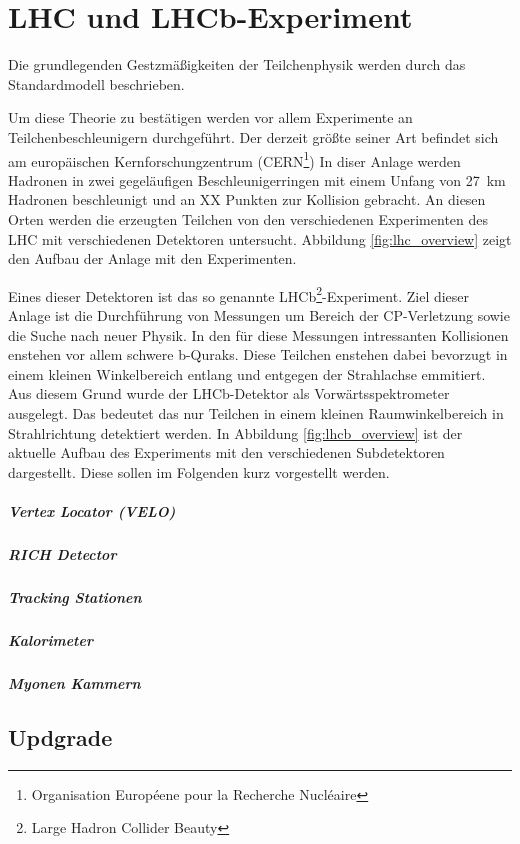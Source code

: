 \chapter{LHC und LHCb-Experiment}
Die grundlegenden Gestzmäßigkeiten der Teilchenphysik werden durch das Standardmodell beschrieben. 



Um diese Theorie zu bestätigen werden vor allem Experimente an Teilchenbeschleunigern durchgeführt.
Der derzeit größte seiner Art befindet sich am europäischen Kernforschungzentrum (CERN\footnote{Organisation Européene pour la Recherche Nucléaire})
In diser Anlage werden Hadronen in zwei gegeläufigen Beschleunigerringen mit einem Unfang von \SI{27}{\kilo\meter} Hadronen beschleunigt und an XX 
Punkten zur Kollision gebracht. An diesen Orten werden die erzeugten Teilchen von den verschiedenen Experimenten des LHC mit verschiedenen 
Detektoren untersucht. Abbildung \ref{fig:lhc_overview} zeigt den Aufbau der Anlage mit den Experimenten. 

\noindent
Eines dieser Detektoren ist das so genannte LHCb\footnote{Large Hadron Collider Beauty}-Experiment. Ziel dieser Anlage ist die Durchführung
von Messungen um Bereich der CP-Verletzung sowie die Suche nach neuer Physik.
In den für diese Messungen intressanten Kollisionen enstehen vor allem schwere
b-Quraks. Diese Teilchen enstehen dabei bevorzugt in einem kleinen
Winkelbereich entlang und entgegen der Strahlachse emmitiert. Aus diesem Grund
wurde der LHCb-Detektor als Vorwärtsspektrometer ausgelegt. Das bedeutet das
nur Teilchen in einem kleinen Raumwinkelbereich in Strahlrichtung detektiert
werden.
In Abbildung \ref{fig:lhcb_overview} ist der aktuelle Aufbau des Experiments mit den
verschiedenen Subdetektoren dargestellt. Diese sollen im Folgenden kurz
vorgestellt werden. 
\paragraph{Vertex Locator (VELO)}
\paragraph{RICH Detector}
\paragraph{Tracking Stationen}
\paragraph{Kalorimeter}
\paragraph{Myonen Kammern}
\section{Updgrade}



